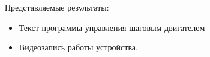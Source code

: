 Представляемые результаты:

\begin{itemize}
    \item Текст программы управления шаговым двигателем
    \item Видеозапись работы устройства.
\end{itemize}

